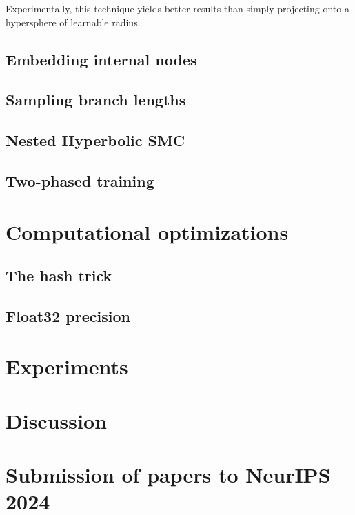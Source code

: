 \documentclass{article}
\begin{document}
Experimentally, this technique yields better results than simply projecting onto a hypersphere of learnable radius.




\subsection{Embedding internal nodes}


\subsection{Sampling branch lengths}


\subsection{Nested Hyperbolic SMC}


\subsection{Two-phased training}


\section{Computational optimizations}


\subsection{The hash trick}


\subsection{Float32 precision}


\section{Experiments}


\section{Discussion}


\section{Submission of papers to NeurIPS 2024}
\end{document}
